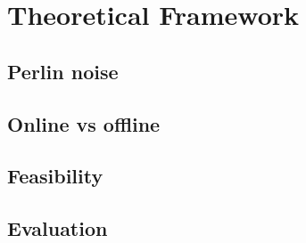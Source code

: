 \section{Theoretical Framework}
\subsection{Perlin noise}
\subsection{Online vs offline}
\subsection{Feasibility}
\subsection{Evaluation}

\cite{DummyCitation}